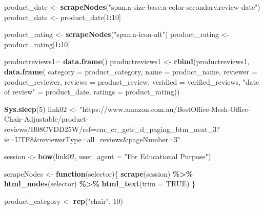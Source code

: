 \documentclass[
]{article}
\newenvironment{Shaded}{\begin{snugshade}}{\end{snugshade}}
\newcommand{\AttributeTok}[1]{\textcolor[rgb]{0.13,0.29,0.53}{#1}}
\newcommand{\ConstantTok}[1]{\textcolor[rgb]{0.56,0.35,0.01}{#1}}
\newcommand{\ControlFlowTok}[1]{\textcolor[rgb]{0.13,0.29,0.53}{\textbf{#1}}}
\newcommand{\DecValTok}[1]{\textcolor[rgb]{0.00,0.00,0.81}{#1}}
\newcommand{\FunctionTok}[1]{\textcolor[rgb]{0.13,0.29,0.53}{\textbf{#1}}}
\newcommand{\NormalTok}[1]{#1}
\newcommand{\OtherTok}[1]{\textcolor[rgb]{0.56,0.35,0.01}{#1}}
\newcommand{\SpecialCharTok}[1]{\textcolor[rgb]{0.81,0.36,0.00}{\textbf{#1}}}
\newcommand{\StringTok}[1]{\textcolor[rgb]{0.31,0.60,0.02}{#1}}
\begin{document}
\begin{Shaded}
\begin{Highlighting}[]
\NormalTok{  product\_date }\OtherTok{\textless{}{-}} \FunctionTok{scrapeNodes}\NormalTok{(}\StringTok{"span.a{-}size{-}base.a{-}color{-}secondary.review{-}date"}\NormalTok{)}
\NormalTok{  product\_date }\OtherTok{\textless{}{-}}\NormalTok{ product\_date[}\DecValTok{1}\SpecialCharTok{:}\DecValTok{10}\NormalTok{]}
  
\NormalTok{  product\_rating }\OtherTok{\textless{}{-}} \FunctionTok{scrapeNodes}\NormalTok{(}\StringTok{"span.a{-}icon{-}alt"}\NormalTok{)}
\NormalTok{  product\_rating }\OtherTok{\textless{}{-}}\NormalTok{ product\_rating[}\DecValTok{1}\SpecialCharTok{:}\DecValTok{10}\NormalTok{]}
  
\NormalTok{  productreviews1}\OtherTok{=} \FunctionTok{data.frame}\NormalTok{()}
\NormalTok{  productreviews1 }\OtherTok{\textless{}{-}} \FunctionTok{rbind}\NormalTok{(productreviews1, }\FunctionTok{data.frame}\NormalTok{(}
                      \AttributeTok{category =}\NormalTok{ product\_category,}
                      \AttributeTok{name =}\NormalTok{ product\_name,}
                      \AttributeTok{reviewer =}\NormalTok{ product\_reviewer,}
                      \AttributeTok{reviews =}\NormalTok{ product\_review,}
                      \AttributeTok{veridied =}\NormalTok{ verified\_reviews,}
                      \StringTok{"date of review"} \OtherTok{=}\NormalTok{ product\_date,}
                      \AttributeTok{ratings =}\NormalTok{ product\_rating))}

  
 \FunctionTok{Sys.sleep}\NormalTok{(}\DecValTok{5}\NormalTok{)}
\NormalTok{link02 }\OtherTok{\textless{}{-}} \StringTok{"https://www.amazon.com.au/BestOffice{-}Mesh{-}Office{-}Chair{-}Adjustable/product{-}reviews/B08CVDD25W/ref=cm\_cr\_getr\_d\_paging\_btm\_next\_3?ie=UTF8\&reviewerType=all\_reviews\&pageNumber=3"}


\NormalTok{  session }\OtherTok{\textless{}{-}} \FunctionTok{bow}\NormalTok{(link02,}
               \AttributeTok{user\_agent =} \StringTok{"For Educational Purpose"}\NormalTok{)}

\NormalTok{  scrapeNodes }\OtherTok{\textless{}{-}} \ControlFlowTok{function}\NormalTok{(selector)\{}
    \FunctionTok{scrape}\NormalTok{(session) }\SpecialCharTok{\%\textgreater{}\%}
      \FunctionTok{html\_nodes}\NormalTok{(selector) }\SpecialCharTok{\%\textgreater{}\%}
      \FunctionTok{html\_text}\NormalTok{(}\AttributeTok{trim =} \ConstantTok{TRUE}\NormalTok{)}
\NormalTok{  \}}

\NormalTok{  product\_category }\OtherTok{\textless{}{-}} \FunctionTok{rep}\NormalTok{(}\StringTok{"chair"}\NormalTok{, }\DecValTok{10}\NormalTok{)}


\end{Highlighting}
\end{Shaded}
\end{document}
